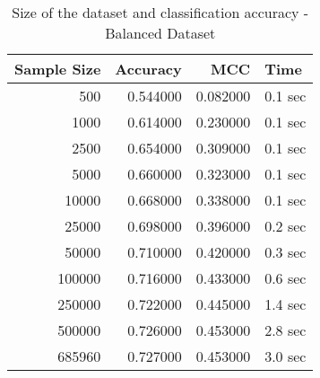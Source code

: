 \begin{table}
\caption{Size of the dataset and classification accuracy - Balanced Dataset}
\label{tab:bal_size}
\begin{tabular}{rrrl}
\toprule
Sample Size & Accuracy & MCC & Time \\
\midrule
500 & 0.544000 & 0.082000 & 0.1 sec \\
1000 & 0.614000 & 0.230000 & 0.1 sec \\
2500 & 0.654000 & 0.309000 & 0.1 sec \\
5000 & 0.660000 & 0.323000 & 0.1 sec \\
10000 & 0.668000 & 0.338000 & 0.1 sec \\
25000 & 0.698000 & 0.396000 & 0.2 sec \\
50000 & 0.710000 & 0.420000 & 0.3 sec \\
100000 & 0.716000 & 0.433000 & 0.6 sec \\
250000 & 0.722000 & 0.445000 & 1.4 sec \\
500000 & 0.726000 & 0.453000 & 2.8 sec \\
685960 & 0.727000 & 0.453000 & 3.0 sec \\
\bottomrule
\end{tabular}
\end{table}

